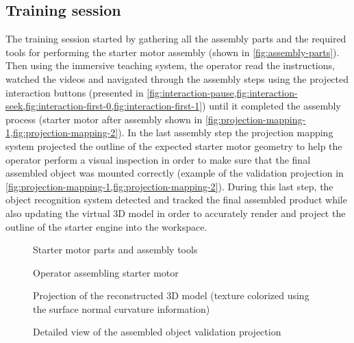 \subsection{Training session}

The training session started by gathering all the assembly parts and the required tools for performing the starter motor assembly (shown in \cref{fig:assembly-parts}). Then using the immersive teaching system, the operator read the instructions, watched the videos and navigated through the assembly steps using the projected interaction buttons (presented in \cref{fig:interaction-pause,fig:interaction-seek,fig:interaction-first-0,fig:interaction-first-1}) until it completed the assembly process (starter motor after assembly shown in \cref{fig:projection-mapping-1,fig:projection-mapping-2}). In the last assembly step the projection mapping system projected the outline of the expected starter motor geometry to help the operator perform a visual inspection in order to make sure that the final assembled object was mounted correctly (example of the validation projection in \cref{fig:projection-mapping-1,fig:projection-mapping-2}). During this last step, the object recognition system detected and tracked the final assembled product while also updating the virtual 3D model in order to accurately render and project the outline of the starter engine into the workspace.


\begin{figure}[ht!]
	\begin{floatrow}[2]
		{\caption{Starter motor parts and assembly tools}\label{fig:assembly-parts}}
		{\caption{Operator assembling starter motor}\label{fig:assembly}}
	\end{floatrow}
\end{figure}

\begin{figure}[ht!]
	\begin{floatrow}[2]
		{\caption{Projection of the reconstructed 3D model (texture colorized using the surface normal curvature information)}\label{fig:projection-mapping-1}}
		{\caption{Detailed view of the assembled object validation projection}\label{fig:projection-mapping-2}}
	\end{floatrow}
\end{figure}

